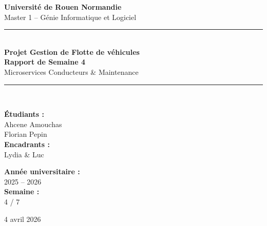 \documentclass[12pt,a4paper]{article}
\begin{document}
\begin{titlepage}
  \centering
  \vspace*{1cm}

  {\Large\textbf{Université de Rouen Normandie}\\[0.3cm]
  \large Master 1 -- Génie Informatique et Logiciel}

  \vspace{1.5cm}
  {\color{primary!55}\rule{\linewidth}{0.5mm}}\\[0.45cm]

  {\Huge\sffamily\bfseries\color{primary} Projet Gestion de Flotte de véhicules\\[0.35cm]}
  {\LARGE\sffamily\bfseries\color{primary!80!black} Rapport de Semaine 4}\\[0.35cm]
  {\large\sffamily\color{primary!65!black} Microservices Conducteurs \& Maintenance}

  {\color{primary!55}\rule{\linewidth}{0.5mm}}\\[1.5cm]

  \begin{minipage}{0.45\textwidth}
    \begin{flushleft}
      \textbf{Étudiants :}\\
      Ahcene Amouchas \\
      Florian Pepin \\[0.5cm]
      \textbf{Encadrants :}\\
      Lydia \& Luc
    \end{flushleft}
  \end{minipage}
  \hfill
  \begin{minipage}{0.45\textwidth}
    \begin{flushright}
      \textbf{Année universitaire :}\\
      2025 -- 2026 \\[0.5cm]
      \textbf{Semaine :}\\
      4 / 7
    \end{flushright}
  \end{minipage}

  \vfill
  {\large 4 avril 2026}
\end{titlepage}

\tableofcontents
\newpage

\end{document}
